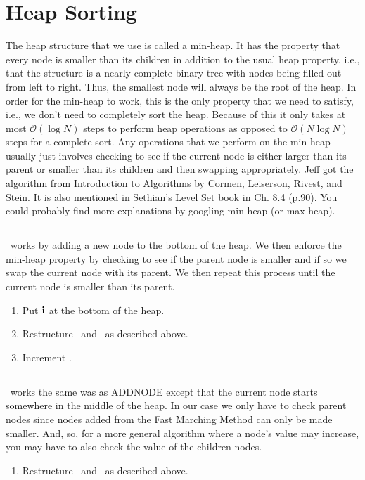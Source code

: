 \section{Heap Sorting}\label{Sec:Heap Sorting}
The heap structure that we use is called a min-heap. It has the property that every node is smaller than its children in addition to the usual heap property, i.e., that the structure is a nearly complete binary tree with nodes being filled out from left to right. Thus, the smallest node will always be the root of the heap. In order for the min-heap to work, this is the only property that we need to satisfy, i.e., we don't need to completely sort the heap. Because of this it only takes at most $\mathcal O(\log N)$ steps to perform heap operations as opposed to $\mathcal O(N\log N)$ steps for a complete sort. Any operations that we perform on the min-heap usually just involves checking to see if the current node is either larger than its parent or smaller than its children and then swapping appropriately.  Jeff got the algorithm from Introduction to Algorithms by Cormen, Leiserson, Rivest, and Stein. It is also mentioned in Sethian's Level Set book in Ch. 8.4 (p.90). You could probably find more explanations by googling min heap (or max heap).
\subsection{\ADDNODE}
\ADDNODE~works by adding a new node to the bottom of the heap. We then enforce the min-heap property by checking to see if the parent node is smaller and if so we swap the current node with its parent. We then repeat this process until the current node is smaller than its parent.
\begin{enumerate}
\item Put ${\bf i}$ at the bottom of the heap.
\item Restructure \heap~and \heaploc~as described above.
\item Increment \numtent.
\end{enumerate}
\subsection{\UPDATENODE}
\UPDATENODE~works the same was as ADDNODE except that the current node starts somewhere in the middle of the heap. In our case we only have to check parent nodes since nodes added from the Fast Marching Method can only be made smaller. And, so, for a more general algorithm where a node's value may increase, you may have to also check the value of the children nodes.
\begin{enumerate}
\item Restructure \heap~and \heaploc~as described above.
\end{enumerate}
